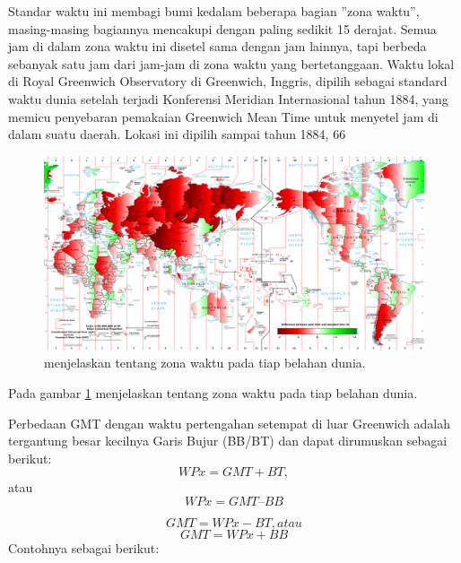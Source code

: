 	Standar waktu ini membagi bumi kedalam beberapa bagian ”zona waktu”, masing-masing bagiannya mencakupi dengan paling sedikit 15 derajat. Semua jam di dalam
zona waktu ini disetel sama dengan jam lainnya, tapi berbeda sebanyak satu jam dari jam-jam di zona waktu yang bertetanggaan. 
Waktu lokal di Royal Greenwich Observatory di Greenwich, Inggris, dipilih sebagai standard waktu dunia setelah terjadi 
Konferensi Meridian Internasional tahun 1884, yang memicu penyebaran pemakaian Greenwich Mean Time untuk menyetel jam di dalam suatu daerah. 
Lokasi ini dipilih sampai tahun 1884, 66 %

\begin{figure}[ht]
\centerline{\includegraphics[width=1\textwidth]{figures/pembagian_waktu_dunia.PNG}}
\caption{menjelaskan tentang zona waktu pada tiap belahan dunia.}
\label{pembagian_waktu_dunia}
\end{figure}

Pada gambar \ref{pembagian_waktu_dunia} menjelaskan tentang zona waktu pada tiap belahan dunia.

	Perbedaan GMT dengan waktu pertengahan setempat di luar Greenwich adalah tergantung besar kecilnya Garis Bujur (BB/BT) dan dapat dirumuskan 
sebagai berikut:
\begin{equation}
WP x = GMT + BT, 
\end {equation}
atau 
\begin{equation}
WP x = GMT – BB
\end {equation}

\begin{equation}
GMT = WP x - BT, 
atau
\end{equation}
\begin{equation}
GMT = WP x + BB
\end{equation}
Contohnya sebagai berikut:

